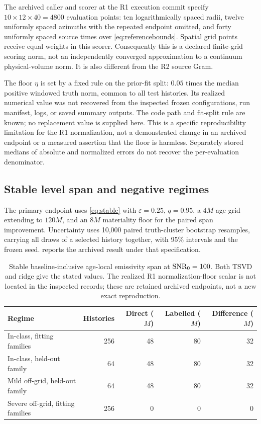 The archived caller and scorer at the R1 execution commit specify $10\times12\times40=4800$ evaluation points: ten logarithmically spaced radii, twelve uniformly spaced azimuths with the repeated endpoint omitted, and forty uniformly spaced source times over \eqref{eq:referencebounds}. Spatial grid points receive equal weights in this scorer. Consequently this is a declared finite-grid scoring norm, not an independently converged approximation to a continuum physical-volume norm. It is also different from the R2 source Gram.

The floor $\eta$ is set by a fixed rule on the prior-fit split: $0.05$ times the median positive windowed truth norm, common to all test histories. Its realized numerical value was not recovered from the inspected frozen configurations, run manifest, logs, or saved summary outputs. The code path and fit-split rule are known; no replacement value is supplied here. This is a specific reproducibility limitation for the R1 normalization, not a demonstrated change in an archived endpoint or a measured assertion that the floor is harmless. Separately stored medians of absolute and normalized errors do not recover the per-evaluation denominator.

\subsection{Stable level span and negative regimes}
The primary endpoint uses \eqref{eq:stable} with $\varepsilon=0.25$, $q=0.95$, a $4M$ age grid extending to $120M$, and an $8M$ materiality floor for the paired span improvement. Uncertainty uses 10,000 paired truth-cluster bootstrap resamples, carrying all draws of a selected history together, with 95\% intervals and the frozen seed.  reports the archived result under that specification.

\begin{table}[htbp]
\centering\small
\caption{Stable baseline-inclusive age-local emissivity span at $\mathrm{SNR}_0=100$. Both TSVD and ridge give the stated values. The realized R1 normalization-floor scalar is not located in the inspected records; these are retained archived endpoints, not a new exact reproduction.}
\label{tab:r1}
\begin{tabular}{l r r r r}
\toprule
Regime&Histories&Direct ($M$)&Labelled ($M$)&Difference ($M$)\\
\midrule
In-class, fitting families&256&48&80&32\\
In-class, held-out family&64&48&80&32\\
Mild off-grid, held-out family&64&48&80&32\\
Severe off-grid, fitting families&256&0&0&0\\
\bottomrule
\end{tabular}
\end{table}

